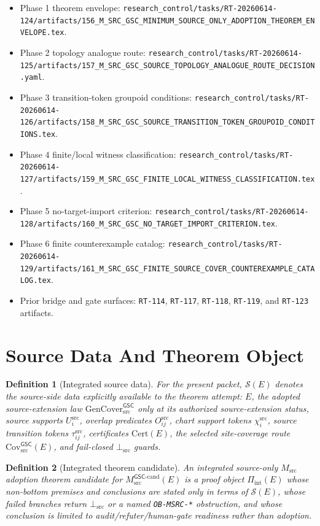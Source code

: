 \documentclass[11pt]{article}
\newcommand{\Msrc}{M_{\mathrm{src}}}
\newcommand{\Mgsccand}{M_{\mathrm{src}}^{\mathsf{GSC}\mbox{-}\mathrm{cand}}}
\newcommand{\GenCover}{\mathrm{GenCover}_{\mathrm{src}}^{\mathsf{GSC}}}
\newcommand{\BottomSrc}{\bot_{\mathrm{src}}}
\newcommand{\CovSrc}{\mathrm{Cov}_{\mathrm{src}}^{\mathsf{GSC}}}
\newcommand{\SourceData}{\mathcal{S}(E)}
\newtheorem{definition}{Definition}
\begin{document}
\begin{itemize}[leftmargin=*]
  \item Phase 1 theorem envelope:
  \texttt{research\_control/tasks/RT-20260614-124/artifacts/156\_M\_SRC\_GSC\_MINIMUM\_SOURCE\_ONLY\_ADOPTION\_THEOREM\_ENVELOPE.tex}.
  \item Phase 2 topology analogue route:
  \texttt{research\_control/tasks/RT-20260614-125/artifacts/157\_M\_SRC\_GSC\_SOURCE\_TOPOLOGY\_ANALOGUE\_ROUTE\_DECISION.yaml}.
  \item Phase 3 transition-token groupoid conditions:
  \texttt{research\_control/tasks/RT-20260614-126/artifacts/158\_M\_SRC\_GSC\_SOURCE\_TRANSITION\_TOKEN\_GROUPOID\_CONDITIONS.tex}.
  \item Phase 4 finite/local witness classification:
  \texttt{research\_control/tasks/RT-20260614-127/artifacts/159\_M\_SRC\_GSC\_FINITE\_LOCAL\_WITNESS\_CLASSIFICATION.tex}.
  \item Phase 5 no-target-import criterion:
  \texttt{research\_control/tasks/RT-20260614-128/artifacts/160\_M\_SRC\_GSC\_NO\_TARGET\_IMPORT\_CRITERION.tex}.
  \item Phase 6 finite counterexample catalog:
  \texttt{research\_control/tasks/RT-20260614-129/artifacts/161\_M\_SRC\_GSC\_FINITE\_SOURCE\_COVER\_COUNTEREXAMPLE\_CATALOG.tex}.
  \item Prior bridge and gate surfaces:
  \texttt{RT-114}, \texttt{RT-117}, \texttt{RT-118}, \texttt{RT-119}, and
  \texttt{RT-123} artifacts.
\end{itemize}

\section{Source Data And Theorem Object}

\begin{definition}[Integrated source data]
For the present packet, \(\SourceData\) denotes the source-side data explicitly
available to the theorem attempt: \(E\), the adopted source-extension law
\(\GenCover\) only at its authorized source-extension status, source supports
\(U_i^{\mathrm{src}}\), overlap predicates \(O_{ij}^{\mathrm{src}}\), chart
support tokens \(\chi_i^{\mathrm{src}}\), source transition tokens
\(\tau_{ij}^{\mathrm{src}}\), certificates \(\mathrm{Cert}(E)\), the selected
site-coverage route \(\CovSrc(E)\), and fail-closed \(\BottomSrc\) guards.
\end{definition}

\begin{definition}[Integrated theorem candidate]
An integrated source-only \(\Msrc\) adoption theorem candidate for
\(\Mgsccand(E)\) is a proof object \(\Pi_{\mathrm{int}}(E)\) whose non-bottom
premises and conclusions are stated only in terms of \(\SourceData\), whose
failed branches return \(\BottomSrc\) or a named \texttt{OB-MSRC-*}
obstruction, and whose conclusion is limited to audit/refuter/human-gate
readiness rather than adoption.
\end{definition}
\end{document}
